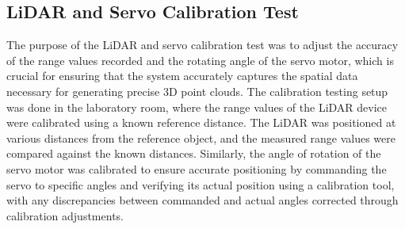 \subsection{LiDAR and Servo Calibration Test}
The purpose of the LiDAR and servo calibration test was to adjust the accuracy of the range values recorded and the rotating angle of the servo motor, which is crucial for ensuring that the system accurately captures the spatial data necessary for generating precise 3D point clouds. The calibration testing setup was done in the laboratory room, where the range values of the LiDAR device were calibrated using a known reference distance. The LiDAR was positioned at various distances from the reference object, and the measured range values were compared against the known distances. Similarly, the angle of rotation of the servo motor was calibrated to ensure accurate positioning by commanding the servo to specific angles and verifying its actual position using a calibration tool, with any discrepancies between commanded and actual angles corrected through calibration adjustments.


